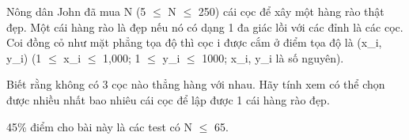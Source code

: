 Nông dân John đã mua N (5  $\le$  N  $\le$  250) cái cọc để xây một hàng rào thật đẹp. Một cái hàng rào là đẹp nếu nó có dạng 1 đa giác lồi với các đỉnh là các cọc. Coi đồng cỏ như mặt phẳng tọa độ thì cọc i được cắm ở điểm tọa độ là (x\_i, y\_i) (1  $\le$  x\_i  $\le$  1,000; 1  $\le$  y\_i  $\le$  1000; x\_i, y\_i là số nguyên).  

   Biết rằng không có 3 cọc nào thẳng hàng với nhau. Hãy tính xem có thể chọn được nhiều nhất bao nhiêu cái cọc để lập được 1 cái hàng rào đẹp.  

   45\% điểm cho bài này là các test có N  $\le$  65.